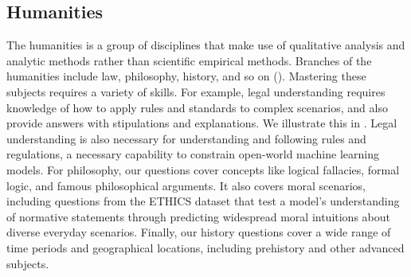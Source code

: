 \subsection{Humanities}
The humanities is a group of disciplines that make use of qualitative analysis and analytic methods rather than scientific empirical methods. Branches of the humanities include law, philosophy, history, and so on (). Mastering these subjects requires a variety of skills. For example, legal understanding requires knowledge of how to apply rules and standards to complex scenarios, and also provide answers with stipulations and explanations. We illustrate this in .
Legal understanding is also necessary for understanding and following rules and regulations, a necessary capability to constrain open-world machine learning models.
For philosophy, our questions cover concepts like logical fallacies, formal logic, and famous philosophical arguments. It also covers moral scenarios, including questions from the ETHICS dataset \citep{hendrycks2020ethicsdataset} that test a model's understanding of normative statements through predicting widespread moral intuitions about diverse everyday scenarios. Finally, our history questions cover a wide range of time periods and geographical locations, including prehistory and other advanced subjects.





